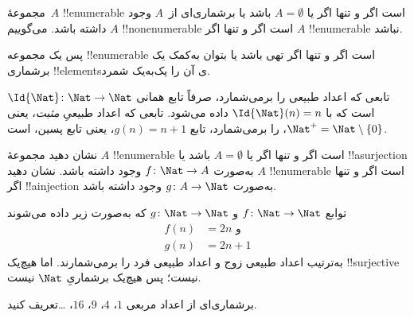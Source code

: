 \documentclass[../../../include/open-logic-section]{subfiles}
\begin{document}
\begin{defn}
  مجموعهٔ~$A$ !!{enumerable} است اگر و تنها اگر یا $A = \emptyset$
  باشد یا برشماری‌ای از~$A$ وجود داشته باشد. می‌گوییم $A$
  !!{nonenumerable} است اگر و تنها اگر $A$ !!{enumerable} نباشد.
\end{defn}

\begin{explain}
پس یک مجموعه !!{enumerable} است اگر و تنها اگر تهی باشد یا بتوان
به‌کمک یک برشماری !!{element}sی آن را یک‌به‌یک شمرد.
\end{explain}

\begin{ex}
تابعی که اعداد طبیعی را برمی‌شمارد، صرفاً تابع همانی
$\Id{\Nat} \colon \Nat \to \Nat$ است که با $\Id{\Nat}(n) = n$ داده
می‌شود. تابعی که اعداد طبیعیِ \emph{مثبت}، یعنی $\Nat^+ =
\Nat \setminus \{0\}$، را برمی‌شمارد، تابع $g(n) = n + 1$، یعنی تابع
پسین، است.
\end{ex}

\begin{prob}
نشان دهید مجموعهٔ $A$ !!{enumerable} است اگر و تنها اگر یا
$A = \emptyset$ باشد یا !!a{surjection} به‌صورت $f\colon \Nat \to A$
وجود داشته باشد. نشان دهید $A$ !!{enumerable} است اگر و تنها اگر
!!a{injection} به‌صورت $g\colon A \to \Nat$ وجود داشته باشد.
\end{prob}

\begin{ex}
توابع $f\colon \Nat \to \Nat$ و $g \colon \Nat \to \Nat$ که
به‌صورت زیر داده می‌شوند
\begin{align*}
  f(n) & = 2n \text{ و}\\
  g(n) & = 2n+1
\end{align*}
به‌ترتیب اعداد طبیعی زوج و اعداد طبیعی فرد را برمی‌شمارند. اما هیچ‌یک
!!{surjective} نیست؛ پس هیچ‌یک برشماریِ $\Nat$ نیست.
\end{ex}

\begin{prob}
برشماری‌ای از اعداد مربعی $1$، $4$، $9$، $16$، \dots تعریف کنید.
\end{prob}
\end{document}

